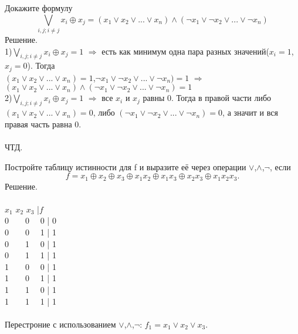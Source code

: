 \begin{exercise}
Докажите формулу
$$\bigvee_{i,j;i\neq j} x_i\oplus x_j=(x_1\vee x_2\vee ...\vee x_n)\wedge(\neg x_1\vee \neg x_2\vee ...\vee \neg x_n)$$
Решение.\\
1)$\bigvee_{i,j;i\neq j} x_i\oplus x_j=1$ $\Rightarrow$ есть как минимум одна пара разных значений($x_i=1$,$x_j=0$). Тогда\\
$(x_1\vee x_2\vee ...\vee x_n)=1$,$\neg x_1\vee \neg x_2\vee ...\vee \neg x_n)=1$ $\Rightarrow$ $(x_1\vee x_2\vee ...\vee x_n)\wedge(\neg x_1\vee \neg x_2\vee ...\vee \neg x_n)=1$\\
2)$\bigvee_{i,j;i\neq j} x_i\oplus x_j=1$ $\Rightarrow$ все $x_i$ и $x_j$ равны 0. Тогда в правой части либо $(x_1\vee x_2\vee ...\vee x_n)=0$, либо $(\neg x_1\vee \neg x_2\vee ...\vee \neg x_n)=0$, а значит и вся правая часть равна 0.\\
\\
ЧТД.
\end{exercise}

\begin{exercise}
Постройте таблицу истинности для f и выразите её через операции $\vee$,$\wedge$,$\neg$, если
$$f=x_1\oplus x_2\oplus x_3\oplus x_1x_2\oplus x_1x_3\oplus x_2x_3\oplus x_1x_2x_3.$$
Решение.\\
\\
$x_1$ $x_2$ $x_3$ |$f$\\
0\ \ \ \  0 \ \   0 | 0\\
0\ \ \ \  0 \ \   1 | 1\\
0\ \ \ \  1 \ \   0 | 1\\
0\ \ \ \  1 \ \   1 | 1\\
1\ \ \ \  0 \ \   0 | 1\\
1\ \ \ \  0 \ \   1 | 1\\
1\ \ \ \  1 \ \   0 | 1\\
1\ \ \ \  1 \ \   1 | 1\\
\\
Перестроние с использованием  $\vee$,$\wedge$,$\neg$: $f_1=x_1\vee x_2\vee x_3$.


\end{exercise}
